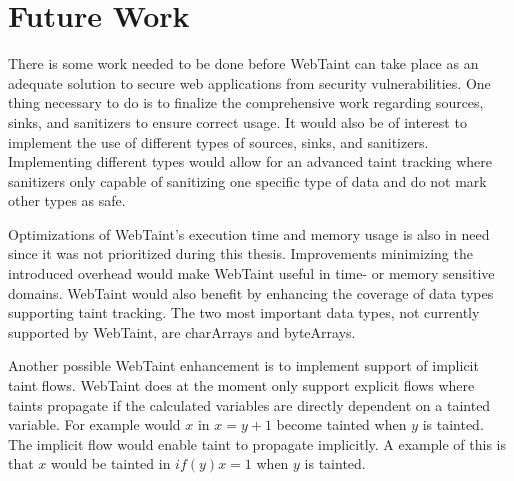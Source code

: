 \chapter{Future Work}
\label{FutureWork}
There is some work needed to be done before WebTaint can take place as an adequate solution to secure web applications from security vulnerabilities. One thing necessary to do is to finalize the comprehensive work regarding sources, sinks, and sanitizers to ensure correct usage. It would also be of interest to implement the use of different types of sources, sinks, and sanitizers. Implementing different types would allow for an advanced taint tracking where sanitizers only capable of sanitizing one specific type of data and do not mark other types as safe. 

Optimizations of WebTaint's execution time and memory usage is also in need since it was not prioritized during this thesis. Improvements minimizing the introduced overhead would make WebTaint useful in time- or memory sensitive domains. WebTaint would also benefit by enhancing the coverage of data types supporting taint tracking. The two most important data types, not currently supported by WebTaint, are charArrays and byteArrays. 

Another possible WebTaint enhancement is to implement support of implicit taint flows. WebTaint does at the moment only support explicit flows where taints propagate if the calculated variables are directly dependent on a tainted variable. For example would $ x $ in $ x = y + 1 $ become tainted when $ y $ is tainted. The implicit flow would enable taint to propagate implicitly. A example of this is that $ x $ would be tainted in $ if (y) x = 1 $ when $ y $ is tainted.